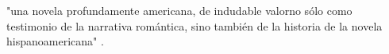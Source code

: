 "una novela profundamente americana, de indudable valorno sólo como testimonio de la narrativa romántica, sino también de la historia de la novela hispanoamericana" \cite[290]{Bellini1997}.